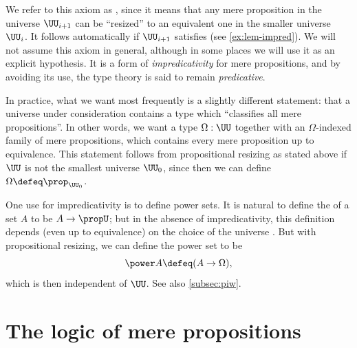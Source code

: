 We refer to this axiom as ,
since it means that any mere proposition in the universe $\UU_{i+1}$ can be ``resized'' to an equivalent one in the smaller universe $\UU_i$.
It follows automatically if $\UU_{i+1}$ satisfies \LEM{} (see \cref{ex:lem-impred}).
We will not assume this axiom in general, although in some places we will use it as an explicit hypothesis.
It is a form of \emph{impredicativity} for mere propositions, and by avoiding its use, the type theory is said to remain \emph{predicative}.
%
%

In practice, what we want most frequently is a slightly different statement: that a universe \UU under consideration contains a type which ``classifies all mere propositions''.
In other words, we want a type $\Omega:\UU$ together with an $\Omega$-indexed family of mere propositions, which contains every mere proposition up to equivalence.
This statement follows from propositional resizing as stated above if $\UU$ is not the smallest universe $\UU_0$, since then we can define $\Omega\defeq \prop_{\UU_0}$.

One use for impredicativity is to define power sets.
It is natural to define the  of a set $A$ to be $A\to\propU$; but in the absence of impredicativity, this definition depends
(even up to equivalence) on the choice of the universe \UU.
But with propositional resizing, we can define the power set to be
%
\[ \power A \defeq (A\to\Omega),\]
which is then independent of $\UU$.
See also \cref{subsec:piw}.


\section{The logic of mere propositions}
